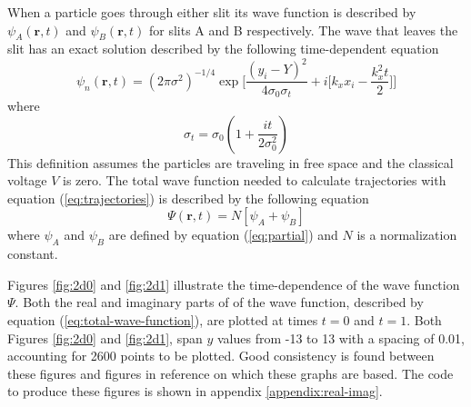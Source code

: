 \documentclass[10pt, reqno]{article}
\begin{document}
  When a particle goes through either slit its wave function is described by $\psi_A(\mathbf{r},t)$ and $\psi_B(\mathbf{r},t)$ for slits A and B respectively.
  The wave that leaves the slit has an exact solution described by the following time-dependent equation \cite{guay-double-slit}
  \begin{equation}
    \label{eq:partial}
    \psi_n(\mathbf{r},t) = (2\pi\sigma^2)^{-1/4} \exp \Bigg[ \frac{(y_i - Y)^2}{4 \sigma_{0} \sigma_{t}} + i \Bigg[ k_x x_i - \frac{k_x^2 t}{2} \Bigg]\Bigg]
  \end{equation}
  where 
  \begin{equation}
    \sigma_{t} = \sigma_{0}(1 + \frac{it}{2\sigma^2_0})
  \end{equation}
  This definition assumes the particles are traveling in free space and the classical voltage $V$ is zero.
  The total wave function needed to calculate trajectories with equation (\ref{eq:trajectories}) is described by the following equation
  \begin{equation}
    \label{eq:total-wave-function}
    \Psi(\mathbf{r},t) = N [\psi_A + \psi_B ]
  \end{equation}
  where $\psi_A$ and $\psi_B$ are defined by equation (\ref{eq:partial}) and $N$ is a normalization constant.

  Figures \ref{fig:2d0} and \ref{fig:2d1} illustrate the time-dependence of the wave function $\Psi$.
  Both the real and imaginary parts of of the wave function, described by equation (\ref{eq:total-wave-function}), are plotted at times $t=0$ and $t=1$. 
  Both Figures \ref{fig:2d0} and \ref{fig:2d1}, span $y$ values from -13 to 13 with a spacing of 0.01, accounting for 2600 points to be plotted.
  Good consistency is found between these figures and figures in reference \cite{guay-double-slit} on which these graphs are based.
  The code to produce these figures is shown in appendix \ref{appendix:real-imag}.
\end{document}
